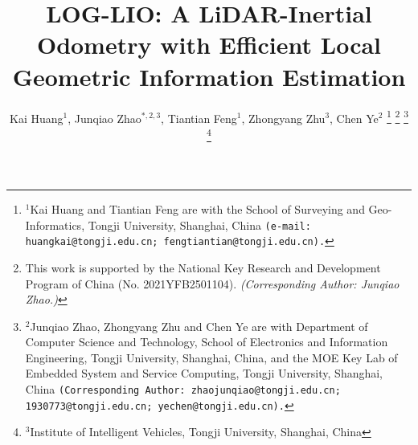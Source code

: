 \documentclass[letterpaper, 10 pt, conference]{ieeeconf}  %
\newcommand{\COMMENT}[1]{\textcolor{red}{ (#1) }}
\begin{document}
\title{
        LOG-LIO: A LiDAR-Inertial Odometry with Efficient Local Geometric Information Estimation
}

\author{Kai Huang$^{1}$, Junqiao Zhao$^{*,2, 3}$, Tiantian Feng$^{1}$, Zhongyang Zhu$^{3}$, Chen Ye$^{2}$%
        \thanks{$^{1}$Kai Huang and Tiantian Feng are with the School of Surveying and Geo-Informatics, Tongji University, Shanghai, China
                        {\tt\footnotesize (e-mail: huangkai@tongji.edu.cn; fengtiantian@tongji.edu.cn).}}
        \thanks{This work is supported by the National Key Research and Development Program of China (No. 2021YFB2501104). \emph{(Corresponding Author: Junqiao Zhao.)}}%
        \thanks{$^{2}$Junqiao Zhao, Zhongyang Zhu and Chen Ye are with Department of Computer Science and Technology,
                School of Electronics and Information Engineering, Tongji University, Shanghai, China, and the MOE Key Lab of Embedded System and Service Computing, Tongji University, Shanghai, China
                        {\tt\footnotesize (Corresponding Author: zhaojunqiao@tongji.edu.cn; 1930773@tongji.edu.cn; yechen@tongji.edu.cn).}}
        \thanks{$^{3}$Institute of Intelligent Vehicles, Tongji University, Shanghai, China}
}

\maketitle
\end{document}
